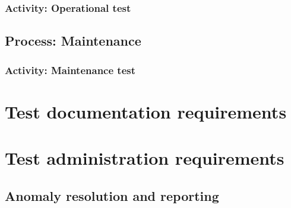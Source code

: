 	\subsubsection{Activity: Operational test} \label{s:details-of-the-master-test-plan:activity-operational-test}
	
	\subsection{Process: Maintenance} \label{s:details-of-the-master-test-plan:process-maintenance}
	
	\subsubsection{Activity: Maintenance test} \label{s:details-of-the-master-test-plan:activity-maintenance-testb}
	
\section{Test documentation requirements} \label{s:details-of-the-master-test-plan:test-documentation-requirements}
	\begin{comment}
		$<$Define the purpose, format, and content of all other testing documents that are to be used (in addition to those that are defined in MTP Section 2.4). A description of these documents may be found in Clause 9 through Clause 16. If the test effort uses test documentation or test levels different from those in this standard (i.e., component, component integration, system, and acceptance), this section needs to map the documentation and process requirements to the test documentation contents defined in this standard. $>$
	\end{comment}

\section{Test administration requirements} \label{s:details-of-the-master-test-plan:test-administration-requirements}
	\begin{comment}
		$<$ Describe the anomaly resolution and reporting processes, task iteration policy, deviation policy, control procedures and standards, practices, and conventions. These activities are needed to administer the tests during execution. $>$
	\end{comment}

\subsection{Anomaly resolution and reporting} \label{s:details-of-the-master-test-plan:anomaly-resolution-and-reporting}
	\begin{comment}
		$<$ Describe the method of reporting and resolving anomalies, including the standards for reporting an anomaly, the Anomaly Report distribution list, and the authority and time line for resolving anomalies. This section of the plan defines the anomaly criticality levels. Classification for software anomalies may be found in IEEE Std 1044TM-1993. $>$
	\end{comment}

